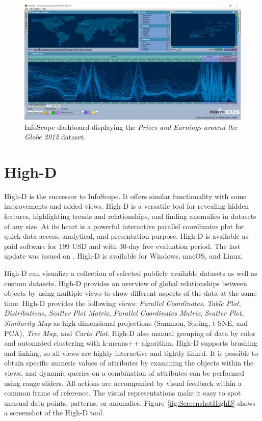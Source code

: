 \begin{figure}[tp]
\centering
\includegraphics[keepaspectratio,width=\linewidth,height=\halfh]
{images/screenshot-infoscope.png}

\caption[InfoScope Dashboard]
{%
InfoScope dashboard displaying the \emph{Prices and Earnings around the Globe 2012} dataset.
}
\label{fig:ScreenshotInfoScope}
\end{figure}




\section{High-D}

High-D \parencite{HighD} is the successor to InfoScope. It offers similar
functionality with some improvements and added views. High-D is a
versatile tool for revealing hidden features, highlighting trends and
relationships, and finding anomalies in datasets of any size. At its heart
is a powerful interactive parallel coordinates plot for quick data access,
analytical, and presentation purpose. High-D is available as paid software
for 199 USD and with 30-day free evaluation period. The last update was
issued on . High-D is available for Windows,
macOS, and Linux.


High-D can visualize a collection of selected publicly available datasets
as well as custom datasets. High-D provides an overview of global
relationships between objects by using multiple views to show different
aspects of the data at the same time. High-D provides the following views:
\emph{Parallel Coordinates}, \emph{Table Plot}, \emph{Distributions},
\emph{Scatter Plot Matrix}, \emph{Parallel Coordinates Matrix},
\emph{Scatter Plot}, \emph{Similarity Map} as high dimensional projections
(Sammon, Spring, t-SNE, and PCA), \emph{Tree Map}, and \emph{Carto Plot}.
High-D also manual grouping of data by color and automated clustering with
k-means++ algorithm. High-D supports brushing and linking, so all views
are highly interactive and tightly linked. It is possible to obtain
specific numeric values of attributes by examining the objects within the
views, and dynamic queries on a combination of attributes can be performed
using range sliders. All actions are accompanied by visual feedback within
a common frame of reference. The visual representations make it easy to
spot unusual data points, patterns, or anomalies.
Figure~\ref{fig:ScreenshotHighD} shows a screenshot of the High-D tool.




